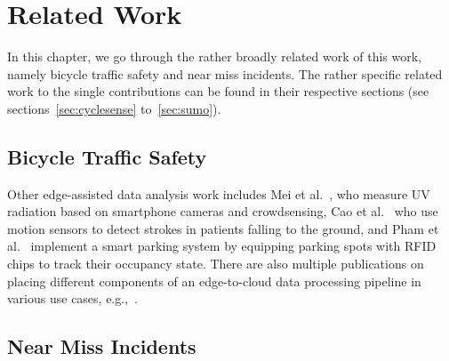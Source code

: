 \cleardoublepage
\chapter{Related Work}
\label{cha:related_work}
In this chapter, we go through the rather broadly related work of this work, namely bicycle traffic safety and near miss incidents.
The rather specific related work to the single contributions can be found in their respective sections (see sections~\ref{sec:cyclesense} to~\ref{sec:sumo}).

\section{Bicycle Traffic Safety}
\label{sec:bicycle_traffic_safety_related_work}
Other edge-assisted data analysis work includes Mei et al.~\cite{mei2017ultraviolet}, who measure UV radiation based on smartphone cameras and crowdsensing,
Cao et al.~\cite{cao2015fast} who use motion sensors to detect strokes in patients falling to the ground, and
Pham et al.~\cite{pham2015a} implement a smart parking system by equipping parking spots with RFID chips to track their occupancy state.
There are also multiple publications on placing different components of an edge-to-cloud data processing pipeline in various use cases, e.g.,~\cite{lujic2021increasing,pfandzelter2021zero,hattab2019optimized}.

\section{Near Miss Incidents}
\label{sec:near_miss_incidents_related_work}